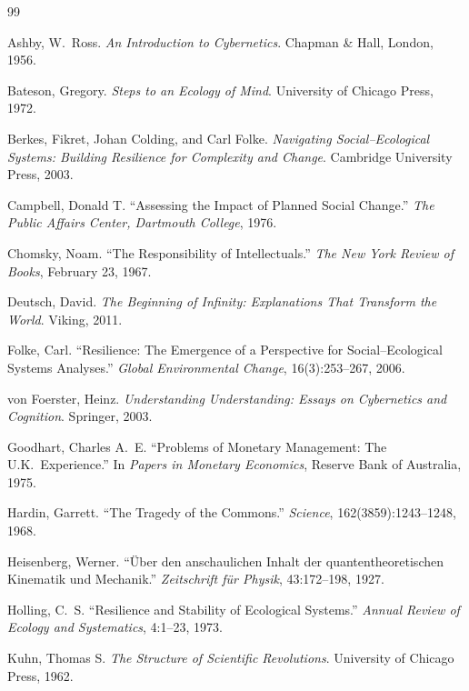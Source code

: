 \documentclass[12pt, a4paper]{article}
\theoremstyle{flyxion}
\begin{document}
\bigskip

\begin{thebibliography}{99}

Ashby, W.~Ross.
\textit{An Introduction to Cybernetics}.
Chapman \& Hall, London, 1956.

Bateson, Gregory.
\textit{Steps to an Ecology of Mind}.
University of Chicago Press, 1972.

Berkes, Fikret, Johan Colding, and Carl Folke.
\textit{Navigating Social--Ecological Systems:
Building Resilience for Complexity and Change}.
Cambridge University Press, 2003.

Campbell, Donald T.
``Assessing the Impact of Planned Social Change.''
\textit{The Public Affairs Center, Dartmouth College}, 1976.

Chomsky, Noam.
``The Responsibility of Intellectuals.''
\textit{The New York Review of Books},
February 23, 1967.

Deutsch, David.
\textit{The Beginning of Infinity: Explanations That Transform the World}.
Viking, 2011.

Folke, Carl.
``Resilience: The Emergence of a Perspective for Social--Ecological Systems Analyses.''
\textit{Global Environmental Change},
16(3):253--267, 2006.

von Foerster, Heinz.
\textit{Understanding Understanding: Essays on Cybernetics and Cognition}.
Springer, 2003.

Goodhart, Charles A.~E.
``Problems of Monetary Management: The U.K.\ Experience.''
In \textit{Papers in Monetary Economics},
Reserve Bank of Australia, 1975.

Hardin, Garrett.
``The Tragedy of the Commons.''
\textit{Science},
162(3859):1243--1248, 1968.

Heisenberg, Werner.
``\"{U}ber den anschaulichen Inhalt der quantentheoretischen Kinematik und Mechanik.''
\textit{Zeitschrift f\"{u}r Physik},
43:172--198, 1927.

Holling, C.~S.
``Resilience and Stability of Ecological Systems.''
\textit{Annual Review of Ecology and Systematics},
4:1--23, 1973.

Kuhn, Thomas S.
\textit{The Structure of Scientific Revolutions}.
University of Chicago Press, 1962.


\end{thebibliography}
\end{document}
